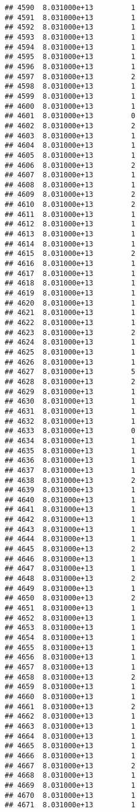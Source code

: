 \documentclass[
]{article}
\begin{document}
\begin{verbatim}
## 4590  8.031000e+13         1
## 4591  8.031000e+13         1
## 4592  8.031000e+13         1
## 4593  8.031000e+13         1
## 4594  8.031000e+13         1
## 4595  8.031000e+13         1
## 4596  8.031000e+13         1
## 4597  8.031000e+13         2
## 4598  8.031000e+13         1
## 4599  8.031000e+13         1
## 4600  8.031000e+13         1
## 4601  8.031000e+13         0
## 4602  8.031000e+13         2
## 4603  8.031000e+13         1
## 4604  8.031000e+13         1
## 4605  8.031000e+13         1
## 4606  8.031000e+13         2
## 4607  8.031000e+13         1
## 4608  8.031000e+13         1
## 4609  8.031000e+13         2
## 4610  8.031000e+13         2
## 4611  8.031000e+13         1
## 4612  8.031000e+13         1
## 4613  8.031000e+13         1
## 4614  8.031000e+13         1
## 4615  8.031000e+13         2
## 4616  8.031000e+13         1
## 4617  8.031000e+13         1
## 4618  8.031000e+13         1
## 4619  8.031000e+13         1
## 4620  8.031000e+13         1
## 4621  8.031000e+13         1
## 4622  8.031000e+13         1
## 4623  8.031000e+13         2
## 4624  8.031000e+13         1
## 4625  8.031000e+13         1
## 4626  8.031000e+13         1
## 4627  8.031000e+13         5
## 4628  8.031000e+13         2
## 4629  8.031000e+13         1
## 4630  8.031000e+13         1
## 4631  8.031000e+13         1
## 4632  8.031000e+13         1
## 4633  8.031000e+13         0
## 4634  8.031000e+13         1
## 4635  8.031000e+13         1
## 4636  8.031000e+13         1
## 4637  8.031000e+13         1
## 4638  8.031000e+13         2
## 4639  8.031000e+13         1
## 4640  8.031000e+13         1
## 4641  8.031000e+13         1
## 4642  8.031000e+13         1
## 4643  8.031000e+13         1
## 4644  8.031000e+13         1
## 4645  8.031000e+13         2
## 4646  8.031000e+13         1
## 4647  8.031000e+13         1
## 4648  8.031000e+13         2
## 4649  8.031000e+13         1
## 4650  8.031000e+13         2
## 4651  8.031000e+13         1
## 4652  8.031000e+13         1
## 4653  8.031000e+13         1
## 4654  8.031000e+13         1
## 4655  8.031000e+13         1
## 4656  8.031000e+13         1
## 4657  8.031000e+13         1
## 4658  8.031000e+13         2
## 4659  8.031000e+13         1
## 4660  8.031000e+13         1
## 4661  8.031000e+13         2
## 4662  8.031000e+13         1
## 4663  8.031000e+13         1
## 4664  8.031000e+13         1
## 4665  8.031000e+13         1
## 4666  8.031000e+13         1
## 4667  8.031000e+13         2
## 4668  8.031000e+13         1
## 4669  8.031000e+13         1
## 4670  8.031000e+13         1
## 4671  8.031000e+13         1

\end{verbatim}
\end{document}
